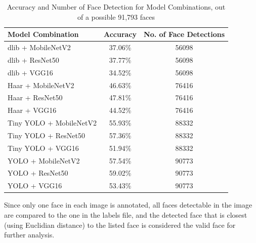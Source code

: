 \begin{table}[h!]
\centering
\caption{Accuracy and Number of Face Detection for Model Combinations, out of a possible 91,793 faces}
\begin{tabular}{|l|c|c|}
\hline
\textbf{Model Combination}   & \textbf{Accuracy} & \textbf{No. of Face Detections} \\ \hline
dlib + MobileNetV2           & 37.06\%           & 56098                                   \\ \hline
dlib + ResNet50              & 37.77\%            & 56098                                   \\ \hline
dlib + VGG16                 & 34.52\%            & 56098                                   \\ \hline
Haar + MobileNetV2           & 46.63\%            & 76416                                   \\ \hline
Haar + ResNet50              & 47.81\%            & 76416                                   \\ \hline
Haar + VGG16                 & 44.52\%            & 76416                                   \\ \hline
Tiny YOLO + MobileNetV2      & 55.93\%            & 88332                                   \\ \hline
Tiny YOLO + ResNet50         & 57.36\%            & 88332                                   \\ \hline
Tiny YOLO + VGG16            & 51.94\%            & 88332                                   \\ \hline
YOLO + MobileNetV2           & 57.54\%            & 90773                                   \\ \hline
YOLO + ResNet50              & 59.02\%            & 90773                                   \\ \hline
YOLO + VGG16                 & 53.43\%            & 90773                                   \\ \hline
\end{tabular}
\label{tab:model_combinations_accuracy}
\end{table}

Since only one face in each image is annotated, all faces detectable in the image are compared to the one in the labels file, and the detected face that is closest (using Euclidian distance) to the listed face is considered the valid face for further analysis.

